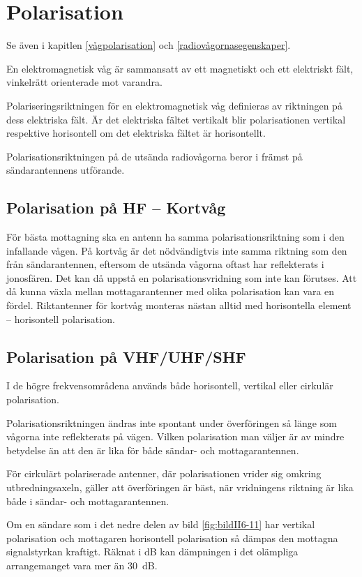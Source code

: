 \section{Polarisation}

Se även i kapitlen \ref{vågpolarisation} och \ref{radiovågornasegenskaper}.

En elektromagnetisk våg är sammansatt av ett magnetiskt och ett
elektriskt fält, vinkelrätt orienterade mot varandra.

Polariseringsriktningen för en elektromagnetisk våg definieras av riktningen på
dess elektriska fält.
Är det elektriska fältet vertikalt blir polarisationen vertikal respektive
horisontell om det elektriska fältet är horisontellt.

Polarisationsriktningen på de utsända radiovågorna beror i främst på
sändarantennens utförande.

\subsection{Polarisation på HF -- Kortvåg}
För bästa mottagning ska en antenn ha samma polarisationsriktning som i den
infallande vågen.
På kortvåg är det nödvändigtvis inte samma riktning som den från
sändarantennen, eftersom de utsända vågorna oftast har reflekterats i
jonosfären.
Det kan då uppstå en polarisationsvridning som inte kan förutses.
Att då kunna växla mellan mottagarantenner med olika polarisation kan vara en
fördel.
Riktantenner för kortvåg monteras nästan alltid med horisontella element --
horisontell polarisation.

\subsection{Polarisation på VHF/UHF/SHF}


I de högre frekvensområdena används både horisontell, vertikal eller
cirkulär polarisation.

Polarisationsriktningen ändras inte spontant under överföringen så
länge som vågorna inte reflekterats på vägen.
Vilken polarisation man väljer är av mindre betydelse än att den är lika
för både sändar- och mottagarantennen.

För cirkulärt polariserade antenner, där polarisationen vrider sig
omkring utbredningsaxeln, gäller att överföringen är bäst, när
vridningens riktning är lika både i sändar- och mottagarantennen.

Om en sändare som i det nedre delen av bild \ref{fig:bildII6-11} har vertikal
polarisation och mottagaren horisontell polarisation så dämpas den mottagna
signalstyrkan kraftigt.
Räknat i dB kan dämpningen i det olämpliga arrangemanget vara mer än 30~dB.
